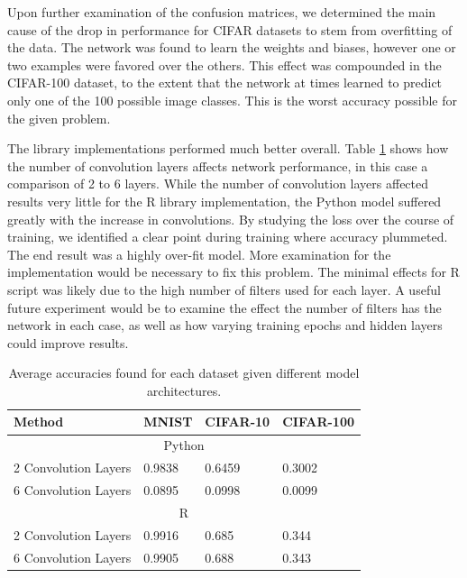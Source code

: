 \documentclass[letterpaper]{article} %
\begin{document}
Upon further examination of the confusion matrices, we determined the main cause of the
drop in performance for CIFAR datasets to stem from overfitting of the data.
The network was found to learn the weights and biases, however one or two examples were favored over the others.
This effect was compounded in the CIFAR-100 dataset, to the extent that the network at times learned to predict
only one of the 100 possible image classes.
This is the worst accuracy possible for the given problem.

The library implementations performed much better overall.
Table \ref{tbl:accuracies} shows how the number of convolution layers affects network performance,
in this case a comparison of 2 to 6 layers.
While the number of convolution layers affected results very little for the R library implementation,
the Python model suffered greatly with the increase in convolutions. By studying the loss over the course of
training, we identified a clear point during training where accuracy plummeted.
The end result was a highly over-fit model.
More examination for the implementation would be necessary to fix this problem.
The minimal effects for R script was likely due to the high number of filters used for each layer.
A useful future experiment would be to examine the effect the number of filters has the network in each case,
as well as how varying training epochs and hidden layers could improve results.

\begin{table}[t]
\begin{centering}
\bgroup
\def\arraystretch{1.5}
\begin{tabular}{| m{} | m{} | m{} | m{} |} 
\hline
Method & MNIST & CIFAR-10 & CIFAR-100 \\ 
\hline
\hline
\multicolumn{4}{|c|}{Python} \\
\hline
2 Convolution Layers & 0.9838 & 0.6459 & 0.3002 \\
\hline
6 Convolution Layers & 0.0895 & 0.0998 & 0.0099 \\
\hline
\multicolumn{4}{|c|}{R} \\
\hline
2 Convolution Layers & 0.9916 & 0.685 & 0.344 \\
\hline
6 Convolution Layers & 0.9905 & 0.688 & 0.343 \\
\hline
\end{tabular}
\caption{Average accuracies found for each dataset given different model architectures.}
\label{tbl:accuracies}
\egroup
\end{centering}
\end{table}
\end{document}
